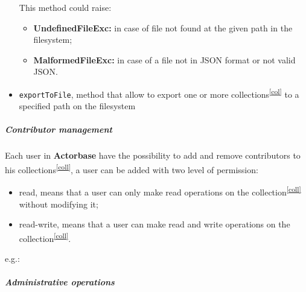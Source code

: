 \documentclass{scalatekids-article}
\begin{document}
\begin{itemize}
  This method could raise:
  \begin{itemize}
  \item \textbf{UndefinedFileExc:} in case of file not found at the given path in the filesystem;
  \item \textbf{MalformedFileExc:} in case of a file not in JSON format or not valid JSON.
  \end{itemize}

\item \verb=exportToFile=, method that allow to export one or more collections\textsuperscript{\ref{col}} to a specified path on the filesystem

\end{itemize}

\subparagraph{Contributor management}

Each user in \textbf{Actorbase} have the possibility to add and remove contributors
to his collections\textsuperscript{\ref{coll}}, a user can be added with two level of
permission:
\begin{itemize}
\item read, means that a user can only make read operations on the collection\textsuperscript{\ref{coll}} without modifying it;
\item read-write, means that a user can make read and write operations on the collection\textsuperscript{\ref{coll}}.
\end{itemize}
e.g.:

\subparagraph{Administrative operations}
\end{document}
